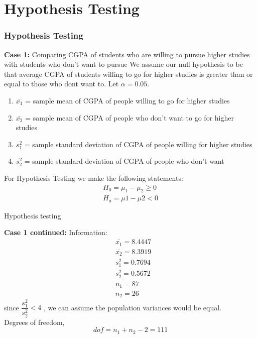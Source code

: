 \documentclass{beamer}
\begin{document}
\section{Hypothesis Testing}
\begin{frame}
    \frametitle{Hypothesis Testing}
    \begin{block}{\textbf{Case 1:}{ Comparing CGPA of students who are willing
                to
                pursue higher studies with students who don't want to pursue
            }}
        We assume our null hypothesis to be that average CGPA of students
        willing
        to go for higher studies is  greater than or equal to those who dont
        want to. Let
        $\alpha =
            0.05$.
        \begin{enumerate}
            \item	$\bar{x_1}$ = sample mean of CGPA of people willing to
                  go for
                  higher studies\\
            \item	$\bar{x_2}$ = sample mean of CGPA of people who  don't
                  want to
                  go for higher studies\\
            \item	$s^2_1$ = sample standard deviation of CGPA of people
                  willing
                  for higher studies\\
            \item	$s^2_2$ = sample standard deviation of CGPA of people
                  who
                  don't want \\
        \end{enumerate}
        For Hypothesis Testing we make the following statements:
        \begin{align}
            H_0=\mu_1-\mu_2\geq0 \\
            H_a=\mu1-\mu2<0
        \end{align}
    \end{block}
\end{frame}

\begin{frame}{Hypothesis testing}
    \begin{block}{\textbf{Case 1 continued:}}
        Information:
        \begin{align}
             & \bar{x_1}=8.4447 \\
             & \bar{x_2}=8.3919 \\
             & s^2_1=0.7694     \\
             & s^2_2=0.5672     \\
             & n_1=87           \\
             & n_2=26
        \end{align}
        since $\dfrac{s^2_1}{s^2_2}<4$ , we can assume the population variances
        would be equal. \\
        Degrees of freedom, $$dof=n_1+n_2-2=111$$
    \end{block}
\end{frame}
\end{document}
